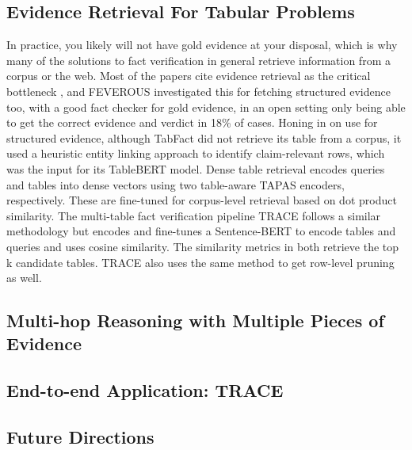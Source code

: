 \subsection{Evidence Retrieval For Tabular Problems}
In practice, you likely will not have gold evidence at your disposal, which is why many of the solutions to fact verification in general retrieve information from a corpus or the web. Most of the papers cite evidence retrieval as the critical bottleneck \parencite{zheng2024evidence}, and FEVEROUS \parencite{aly2021feverous} investigated this for fetching structured evidence too, with a good fact checker for gold evidence, in an open setting only being able to get the correct evidence and verdict in 18\% of cases. Honing in on use for structured evidence, although TabFact \parencite{chen2019tabfact} did not retrieve its table from a corpus, it used a heuristic entity linking approach to identify claim-relevant rows, which was the input for its TableBERT model. Dense table retrieval \parencite{herzig2021open} encodes queries and tables into dense vectors using two table-aware TAPAS \parencite{herzig2020tapas} encoders, respectively. These are fine-tuned for corpus-level retrieval based on dot product similarity. The multi-table fact verification pipeline TRACE \parencite{zhang2026trace} follows a similar methodology but encodes and fine-tunes a Sentence-BERT \parencite{reimers2019sentence} to encode tables and queries and uses cosine similarity. The similarity metrics in both retrieve the top k candidate tables. TRACE also uses the same method to get row-level pruning as well. 

\subsection{Multi-hop Reasoning with Multiple Pieces of Evidence}

\subsection{End-to-end Application: TRACE}

\subsection{Future Directions}